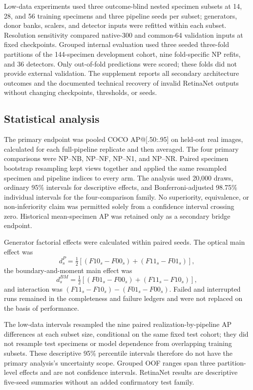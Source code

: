 \documentclass[11pt]{article}
\begin{document}
Low-data experiments used three outcome-blind nested specimen subsets at 14, 28, and 56 training specimens and three pipeline seeds per subset; generators, donor banks, scalers, and detector inputs were refitted within each subset. Resolution sensitivity compared native-300 and common-64 validation inputs at fixed checkpoints. Grouped internal evaluation used three seeded three-fold partitions of the 144-specimen development cohort, nine fold-specific NP refits, and 36 detectors. Only out-of-fold predictions were scored; these folds did not provide external validation. The supplement reports all secondary architecture outcomes and the documented technical recovery of invalid RetinaNet outputs without changing checkpoints, thresholds, or seeds.

\subsection{Statistical analysis}
The primary endpoint was pooled COCO AP@[.50:.95] on held-out real images, calculated for each full-pipeline replicate and then averaged. The four primary comparisons were NP--NB, NP--NF, NP--N1, and NP--NR. Paired specimen bootstrap resampling kept views together and applied the same resampled specimen and pipeline indices to every arm. The analysis used 20,000 draws, ordinary 95\% intervals for descriptive effects, and Bonferroni-adjusted 98.75\% individual intervals for the four-comparison family. No superiority, equivalence, or non-inferiority claim was permitted solely from a confidence interval crossing zero. Historical mean-specimen AP was retained only as a secondary bridge endpoint.

Generator factorial effects were calculated within paired seeds. The optical main effect was
\[
d_s^P=\tfrac12[(F10_s-F00_s)+(F11_s-F01_s)],
\]
the boundary-and-moment main effect was
\[
d_s^{BM}=\tfrac12[(F01_s-F00_s)+(F11_s-F10_s)],
\]
and interaction was $(F11_s-F10_s)-(F01_s-F00_s)$. Failed and interrupted runs remained in the completeness and failure ledgers and were not replaced on the basis of performance.

The low-data intervals resampled the nine paired realization-by-pipeline AP differences at each subset size, conditional on the same fixed test cohort; they did not resample test specimens or model dependence from overlapping training subsets. These descriptive 95\% percentile intervals therefore do not have the primary analysis's uncertainty scope. Grouped OOF ranges span three partition-level effects and are not confidence intervals. RetinaNet results are descriptive five-seed summaries without an added confirmatory test family.
\end{document}
